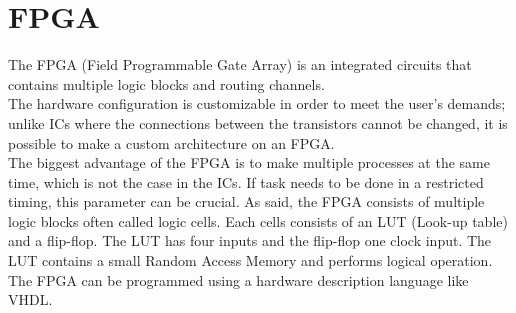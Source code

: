 \section{FPGA}


The FPGA (Field Programmable Gate Array) is an integrated circuits that contains multiple logic blocks and routing channels. \\
The hardware configuration is customizable in order to meet the user’s demands; unlike ICs where the connections between the transistors cannot be changed, it is possible to make a custom architecture on an FPGA. \\
The biggest advantage of the FPGA is to make multiple processes at the same time, which is not the case in the ICs. If task needs to be done in a restricted timing, this parameter can be crucial. 
As said, the FPGA consists of multiple logic blocks often called logic cells. Each cells consists of an LUT (Look-up table) and a flip-flop. The LUT has four inputs and the flip-flop one clock input. The LUT contains a small Random Access Memory and performs logical operation. \\


The FPGA can be programmed using a hardware description language like VHDL. \\







